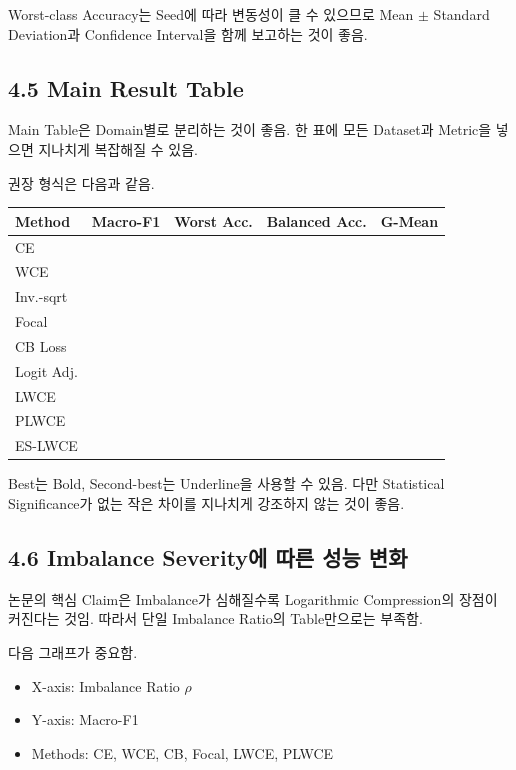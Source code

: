 \documentclass[11pt,a4paper]{article}
\begin{document}
Worst-class Accuracy는 Seed에 따라 변동성이 클 수 있으므로 Mean \(\pm\) Standard Deviation과 Confidence Interval을 함께 보고하는 것이 좋음.

\subsection{4.5 Main Result Table}

Main Table은 Domain별로 분리하는 것이 좋음. 한 표에 모든 Dataset과 Metric을 넣으면 지나치게 복잡해질 수 있음.

권장 형식은 다음과 같음.

\begin{center}
\begin{tabular}{lcccc}
\toprule
Method & Macro-F1 & Worst Acc. & Balanced Acc. & G-Mean \\
\midrule
CE & & & & \\
WCE & & & & \\
Inv.-sqrt & & & & \\
Focal & & & & \\
CB Loss & & & & \\
Logit Adj. & & & & \\
LWCE & & & & \\
PLWCE & & & & \\
ES-LWCE & & & & \\
\bottomrule
\end{tabular}
\end{center}

Best는 Bold, Second-best는 Underline을 사용할 수 있음. 다만 Statistical Significance가 없는 작은 차이를 지나치게 강조하지 않는 것이 좋음.

\subsection{4.6 Imbalance Severity에 따른 성능 변화}

논문의 핵심 Claim은 Imbalance가 심해질수록 Logarithmic Compression의 장점이 커진다는 것임. 따라서 단일 Imbalance Ratio의 Table만으로는 부족함.

다음 그래프가 중요함.

\begin{itemize}
\item X-axis: Imbalance Ratio \(\rho\)
\item Y-axis: Macro-F1
\item Methods: CE, WCE, CB, Focal, LWCE, PLWCE
\end{itemize}
\end{document}

